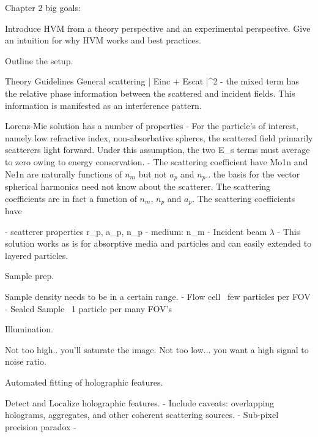 Chapter 2 big goals:

Introduce HVM from a theory perspective and an experimental perspective.
Give an intuition for why HVM works and best practices.

Outline the setup.

Theory Guidelines
 General scattering | Einc + Escat |^2
 - the mixed term has the relative phase information between
   the scattered and incident fields. This information is manifested
   as an interference pattern.

 Lorenz-Mie solution has a number of properties
 - For the particle's of interest, namely low refractive index, non-absorbative
 spheres, the scattered field primarily scatterers light forward. Under this
 assumption, the two E_s terms must average to zero owing to energy conservation.
 - The scattering coefficient have
 Mo1n and Ne1n are naturally functions of $n_m$ but not $a_p$ and $n_p$.. the basis
 for the vector spherical harmonics need not know about the scatterer. The scattering
 coefficients are in fact a function of $n_m$, $n_p$ and $a_p$. The scattering coefficients
 have

 - scatterer properties r_p, a_p, n_p
 - medium: n_m
 - Incident beam  $\lambda$
 - This solution works as is for absorptive media and particles and can easily
 extended to layered particles.


Sample prep.

Sample density needs to be in a certain range.
- Flow cell ~few particles per FOV
- Sealed Sample ~1 particle per many FOV's

Illumination.

Not too high.. you'll saturate the image.
Not too low... you want a high signal to noise ratio.

Automated fitting of holographic features.

Detect and Localize holographic features.
- Include caveats: overlapping holograms, aggregates, and other coherent scattering sources.
- Sub-pixel precision paradox
- 
